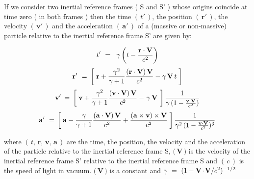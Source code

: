 \documentclass[10pt,fleqn]{article}
\begin{document}
\noindent If we consider two inertial reference frames ( S and S' ) whose origins coincide at time zero ( in both frames ) then the time $( \, {t}' \, )$, the position $( \, {\mathbf{r}}' \, )$, the velocity $( \, {\mathbf{v}}' \, )$ and the acceleration $( \, {\mathbf{a}}' \, )$ of a (massive or non-massive) particle relative to the inertial reference frame S' are given by:
\par \vspace{+0.21em}
\begin{eqnarray*}
{t}' ~=~ \hspace{+0.24em} \gamma \left ( t - \frac{\mathbf{r} \cdot \mathbf{V}}{c^2} \right )
\end{eqnarray*}
\vspace{+0.15em}
\begin{eqnarray*}
{\mathbf{r}}' ~=~ \hspace{-0.09em} \left [ \; \mathbf{r} + \frac{\gamma^2}{\gamma + 1} \frac{( \mathbf{r} \cdot \mathbf{V} ) \, \mathbf{V}}{c^2} - \gamma \, \mathbf{V} \, t \; \right ]
\end{eqnarray*}
\vspace{+0.30em}
\begin{eqnarray*}
{\mathbf{v}}' \hspace{-0.12em} ~=~ \hspace{-0.12em} \left [ \; \mathbf{v} + \frac{\gamma^2}{\gamma + 1} \frac{( \mathbf{v} \cdot \mathbf{V} ) \, \mathbf{V}}{c^2} - \hspace{+0.114em} \gamma \, \mathbf{V} \hspace{+0.114em} \; \right ] \frac{1}{\gamma \, ( 1 - \frac{\mathbf{v} \cdot \mathbf{V}}{c^2} )}
\end{eqnarray*}
\vspace{+0.30em}
\begin{eqnarray*}
{\mathbf{a}}' ~=~ \hspace{-0.18em} \left [ \; \mathbf{a} - \frac{\gamma}{\gamma + 1} \frac{( \mathbf{a} \cdot \mathbf{V} ) \, \mathbf{V}}{c^2} + \frac{( \mathbf{a} \times \mathbf{v} ) \times \mathbf{V}}{c^2} \; \right ] \frac{1}{\gamma^2 \, ( 1 - \frac{\mathbf{v} \cdot \mathbf{V}}{c^2} )^3}
\end{eqnarray*}
\par \vspace{+1.80em}
\noindent where $( \, t, \, \mathbf{r}, \, \mathbf{v}, \, \mathbf{a} \, )$ are the time, the position, the velocity and the acceleration of the particle relative to the inertial reference frame S, $( \, ${\small $\mathbf{V}$}$ \, )$ is the velocity of the inertial reference frame S' relative to the inertial reference frame S and $( \, c \, )$ is the speed of light in vacuum. $( \, ${\small $\mathbf{V}$}$ \, )$ is a constant and {\small $\gamma ~=~ ({1 - \mathbf{V} \hspace{-0.114em}\cdot\hspace{-0.114em} \mathbf{V}/c^2})^{-1/2}$}
\end{document}
